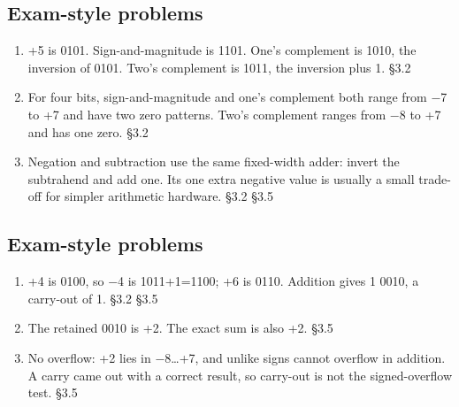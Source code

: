\documentclass[11pt]{article}
\begin{document}
\begin{keepsection}\subsection{Exam-style problems}

\begin{enumerate}
\item +5 is 0101. Sign-and-magnitude is 1101. One’s complement is 1010, the inversion of 0101. Two’s complement is 1011, the inversion plus 1. \hfill{\small\color{FAUblue}§3.2}
\item For four bits, sign-and-magnitude and one’s complement both range from \ensuremath{-}7 to +7 and have two zero patterns. Two’s complement ranges from \ensuremath{-}8 to +7 and has one zero. \hfill{\small\color{FAUblue}§3.2}
\item Negation and subtraction use the same fixed-width adder: invert the subtrahend and add one. Its one extra negative value is usually a small trade-off for simpler arithmetic hardware. \hfill{\small\color{FAUblue}§3.2} \hfill{\small\color{FAUblue}§3.5}
\end{enumerate}

\end{keepsection}
\begin{keepsection}\subsection{Exam-style problems}

\begin{enumerate}
\item +4 is 0100, so \ensuremath{-}4 is 1011+1=1100; +6 is 0110. Addition gives 1 0010, a carry-out of 1. \hfill{\small\color{FAUblue}§3.2} \hfill{\small\color{FAUblue}§3.5}
\item The retained 0010 is +2. The exact sum is also +2. \hfill{\small\color{FAUblue}§3.5}
\item No overflow: +2 lies in \ensuremath{-}8…+7, and unlike signs cannot overflow in addition. A carry came out with a correct result, so carry-out is not the signed-overflow test. \hfill{\small\color{FAUblue}§3.5}
\end{enumerate}

\end{keepsection}
\end{document}

